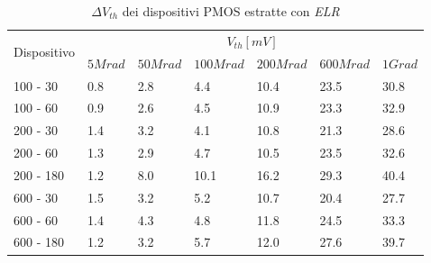 \documentclass[12pt, letterpaper]{book}
\begin{document}
\begin{table}[H]
  \renewcommand{\arraystretch}{1.3}
    \begin{tabular}{m{2cm}  m{1.1cm} m{1.3cm} m{1.5cm} m{1.5cm} m{1.5cm} m{1cm}}
      \toprule
      \multirow{2}{*}{Dispositivo} & \multicolumn{6}{c}{$V_{th} [mV] $}                                                                    \\
      \cmidrule{2-7}
                                   & $5Mrad$ & $50Mrad$ & $100Mrad$ & $200Mrad$ & $600Mrad$ & $1Grad$ \\
      \midrule
	100 - 30				& 0.8		& 2.8		& 4.4		& 10.4		& 23.5		& 30.8   \\
      \hline
      100 - 60				& 0.9		& 2.6		&4.5 		& 10.9		& 23.3		&  32.9  \\
      \hline
      200 - 30				& 1.4		& 3.2		& 4.1		& 10.8		& 21.3		& 28.6   \\
      \hline
      200 - 60				& 1.3		& 2.9		& 4.7		& 10.5		& 23.5		& 32.6  \\
      \hline
      200 - 180				& 1.2		& 8.0		& 10.1		& 16.2		& 29.3		& 40.4   \\
      \hline
      600 - 30				& 1.5		& 3.2		& 5.2		& 10.7  	& 20.4		& 27.7   \\
      \hline
      600 - 60				& 1.4		& 4.3		& 4.8		& 11.8		& 24.5 		& 33.3 \\
      \hline
      600 - 180				& 1.2		&3.2		& 5.7		& 12.0		& 27.6   	& 39.7 \\
      \bottomrule
    \end{tabular}
  \caption{$\Delta V_{th}$ dei dispositivi PMOS estratte con \emph{ELR}}
  \label{tab:deltaVthELRP}
\end{table}
\end{document}
